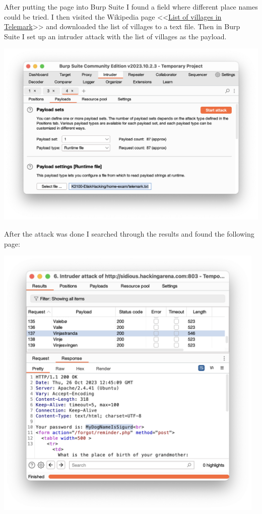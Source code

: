 After putting the page into Burp Suite I found a field where different place names could be tried.
I then visited the Wikipedia page <<\href{https://en.wikipedia.org/wiki/List_of_villages_in_Telemark}{List of villages in Telemark}>> and downloaded the list of villages to a text file.
Then in Burp Suite I set up an intruder attack with the list of villages as the payload.

\begin{center}
    \includegraphics[width=15cm]{img/Web hacking/Arenabook/Skjermbilde 2023-10-26 kl. 14.54.29.png}
\end{center}

After the attack was done I searched through the results and found the following page:

\begin{center}
    \includegraphics[width=13cm]{img/Web hacking/Arenabook/Skjermbilde 2023-10-26 kl. 14.55.08.png}
\end{center}

